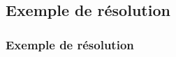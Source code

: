 \documentclass[]{beamer}
\begin{document}
\subsection{Exemple de résolution}
\begin{frame}
  \frametitle{Exemple de résolution}
  \begin{minipage}{.4\textwidth}    

\end{minipage}
\end{frame}
\end{document}
